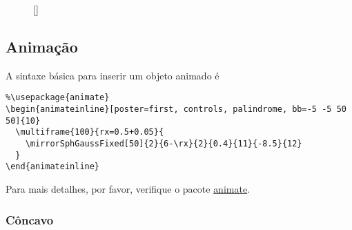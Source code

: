 \documentclass[a4paper,10pt]{article}
\begin{document}
\begin{figure}[!ht]
  \centering
  \begin{minipage}[c]{0.45\linewidth}
  \end{minipage} %
  \begin{minipage}[c]{0.45\linewidth}
  \end{minipage}
  [\linewidth]{
    \hfill
  }
\end{figure}



\subsection{Animação}

A sintaxe básica para inserir um objeto animado é
\begin{FHZmirroLensTcolorbox}
\begin{verbatim}
%\usepackage{animate}
\begin{animateinline}[poster=first, controls, palindrome, bb=-5 -5 50 50]{10}
  \multiframe{100}{rx=0.5+0.05}{
    \mirrorSphGaussFixed[50]{2}{6-\rx}{2}{0.4}{11}{-8.5}{12}
  }
\end{animateinline}
\end{verbatim}
\end{FHZmirroLensTcolorbox}

Para mais detalhes, por favor, verifique o pacote \href{https://ctan.org/pkg/animate}{animate}.

\subsubsection{Côncavo}
\end{document}
